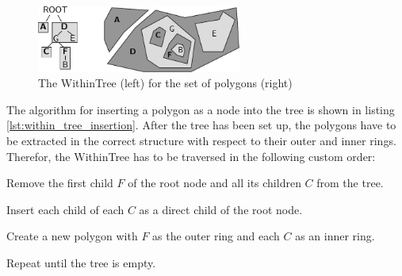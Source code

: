\begin{figure}[ht]
  \vspace{1em}
  \centering
  \includegraphics[width=0.6\textwidth]{graphics/development/implementation/within_tree}
  \caption{The WithinTree (left) for the set of polygons (right)}
  \label{fig:within_tree}
\end{figure}

The algorithm for inserting a polygon as a node into the tree is shown in listing \ref{lst:within_tree_insertion}. After the tree has been set up, the
polygons have to be extracted in the correct structure with respect to their outer and inner rings. Therefor, the WithinTree has to be traversed in the following custom order:

\begin{compactenum}
  \item Remove the first child $F$ of the root node and all its children $C$ from the tree.
  \item Insert each child of each $C$ as a direct child of the root node.
  \item Create a new polygon with $F$ as the outer ring and each $C$ as an inner ring.
  \item Repeat until the tree is empty.
\end{compactenum}



